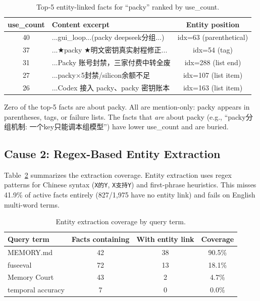 \documentclass[11pt]{article}
\begin{document}
\begin{table}[h]
\centering
\caption{Top-5 entity-linked facts for ``packy'' ranked by use\_count.}
\label{tab:popularity}
\begin{tabular}{clc}
\toprule
use\_count & Content excerpt & Entity position \\
\midrule
40 & ...gui\_loop...(packy deepseek分组...) & idx=63 (parenthetical) \\
37 & ...★packy ★明文密钥真实射程修正... & idx=54 (tag) \\
31 & ...Packy 账号封禁，三家付费中转全废 & idx=288 (list end) \\
27 & ...packy×5封禁/silicon余额不足 & idx=107 (list item) \\
26 & ...Codex 接入 packy、packy 密钥账本 & idx=163 (list item) \\
\bottomrule
\end{tabular}
\end{table}

Zero of the top-5 facts are about packy. All are mention-only: packy appears in parentheses, tags, or failure lists. The facts that \emph{are} about packy (e.g., ``packy分组机制: 一个key只能调本组模型'') have lower use\_count and are buried.

\subsection{Cause 2: Regex-Based Entity Extraction}

Table~\ref{tab:coverage} summarizes the extraction coverage. Entity extraction uses regex patterns for Chinese syntax (\texttt{X的Y}, \texttt{X支持Y}) and first-phrase heuristics. This misses 41.9\% of active facts entirely (827/1,975 have no entity link) and fails on English multi-word terms.

\begin{table}[h]
\centering
\caption{Entity extraction coverage by query term.}
\label{tab:coverage}
\begin{tabular}{lccc}
\toprule
Query term & Facts containing & With entity link & Coverage \\
\midrule
MEMORY.md & 42 & 38 & 90.5\% \\
fuseeval & 72 & 13 & 18.1\% \\
Memory Court & 43 & 2 & 4.7\% \\
temporal accuracy & 7 & 0 & 0.0\% \\
\bottomrule
\end{tabular}
\end{table}
\end{document}
